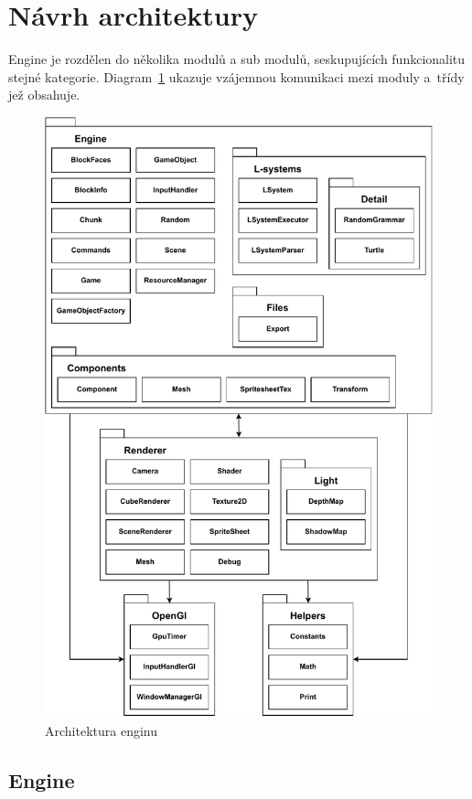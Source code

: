 \documentclass[thesis=M,czech]{FITthesis}[2019/12/23]
\begin{document}
\section{Návrh architektury}

Engine je rozdělen do několika modulů a sub modulů, seskupujících funkcionalitu stejné kategorie. Diagram~\ref{fig:architecture} ukazuje vzájemnou komunikaci mezi moduly a~třídy jež obsahuje.

\begin{figure}\centering
	\includegraphics[width=\textwidth]{images/architecture2}
	\caption[Architektura enginu]{Architektura enginu}\label{fig:architecture}
\end{figure}

\subsection{Engine}
\end{document}
